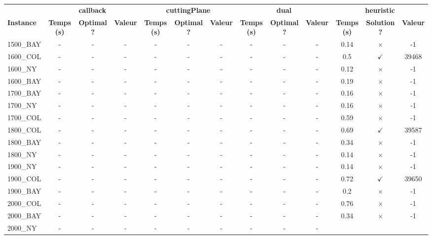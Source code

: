 \documentclass[main.tex]{subfiles}
\begin{document}
\begin{landscape}
\begin{center}
\renewcommand{\arraystretch}{1.4} 
 \begin{tabular}{lcccccccccccc}
	\hline
 & \multicolumn{3}{c}{\textbf{callback}} & \multicolumn{3}{c}{\textbf{cuttingPlane}} & \multicolumn{3}{c}{\textbf{dual}} & \multicolumn{3}{c}{\textbf{heuristic}}\\
\textbf{Instance}  & \textbf{Temps (s)} & \textbf{Optimal ?} & \textbf{Valeur} & \textbf{Temps (s)} & \textbf{Optimal ?} & \textbf{Valeur} & \textbf{Temps (s)} & \textbf{Optimal ?} & \textbf{Valeur} & \textbf{Temps (s)} & \textbf{Solution ?} & \textbf{Valeur}\\\hline

1500\_BAY & - & - & - 
 & - & - & - 
 & - & - & - 
 & 0.14 & $\times$ & -1\\
1600\_COL & - & - & - 
 & - & - & - 
 & - & - & - 
 & 0.5 & $\checkmark$ & 39468\\
1600\_NY & - & - & - 
 & - & - & - 
 & - & - & - 
 & 0.12 & $\times$ & -1\\
1600\_BAY & - & - & - 
 & - & - & - 
 & - & - & - 
 & 0.19 & $\times$ & -1\\
1700\_BAY & - & - & - 
 & - & - & - 
 & - & - & - 
 & 0.16 & $\times$ & -1\\
1700\_NY & - & - & - 
 & - & - & - 
 & - & - & - 
 & 0.16 & $\times$ & -1\\
1700\_COL & - & - & - 
 & - & - & - 
 & - & - & - 
 & 0.59 & $\times$ & -1\\
1800\_COL & - & - & - 
 & - & - & - 
 & - & - & - 
 & 0.69 & $\checkmark$ & 39587\\
1800\_BAY & - & - & - 
 & - & - & - 
 & - & - & - 
 & 0.34 & $\times$ & -1\\
1800\_NY & - & - & - 
 & - & - & - 
 & - & - & - 
 & 0.14 & $\times$ & -1\\
1900\_NY & - & - & - 
 & - & - & - 
 & - & - & - 
 & 0.14 & $\times$ & -1\\
1900\_COL & - & - & - 
 & - & - & - 
 & - & - & - 
 & 0.72 & $\checkmark$ & 39650\\
1900\_BAY & - & - & - 
 & - & - & - 
 & - & - & - 
 & 0.2 & $\times$ & -1\\
2000\_COL & - & - & - 
 & - & - & - 
 & - & - & - 
 & 0.76 & $\times$ & -1\\
2000\_BAY & - & - & - 
 & - & - & - 
 & - & - & - 
 & 0.34 & $\times$ & -1\\
2000\_NY & - & - & - 
 & - & - & - 
 & - & - & - 

\end{tabular}
\end{center}
\end{landscape}
\end{document}
